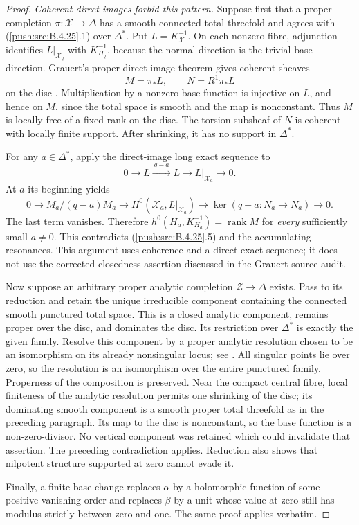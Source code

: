 \begin{proof}
\emph{Coherent direct images forbid this pattern.}
Suppose first that a proper completion
$\pi:\mathcal X\to\Delta$ has a smooth connected
total threefold and agrees with (\ref{push:src:B.4.25}.1) over
$\Delta^*$. Put $L=K_{\mathcal X}^{-1}$.
On each nonzero fibre, adjunction identifies
$L|_{\mathcal X_q}$ with $K_{H_q}^{-1}$, because
the normal direction is the trivial base direction.
Grauert's proper direct-image theorem gives coherent
sheaves
\[
 M=\pi_*L,\qquad N=R^1\pi_*L
\]
on the disc
\citep[Section 6, Hauptsatz I, p.~59]{Grauert1960D}.
Multiplication by a nonzero base function is injective
on $L$, and hence on $M$, since the total space is
smooth and the map is nonconstant. Thus $M$ is
locally free of a fixed rank on the disc. The torsion
subsheaf of $N$ is coherent with locally finite
support. After shrinking, it has no support in
$\Delta^*$.

For any $a\in\Delta^*$, apply the direct-image long
exact sequence to
\[
 0\longrightarrow L\xrightarrow{\ q-a\ }L
 \longrightarrow L|_{\mathcal X_a}\longrightarrow0.
\]
At $a$ its beginning yields
\[
 0\longrightarrow M_a/(q-a)M_a
 \longrightarrow H^0(\mathcal X_a,L|_{\mathcal X_a})
 \longrightarrow \ker(q-a:N_a\to N_a)
 \longrightarrow0.                                   \tag{B.4.25.6}
\]
The last term vanishes. Therefore
$h^0(H_a,K_{H_a}^{-1})=\operatorname{rank}M$ for
\emph{every} sufficiently small $a\ne0$. This
contradicts (\ref{push:src:B.4.25}.5) and the accumulating resonances.
This argument uses coherence and a direct exact
sequence; it does not use the corrected closedness
assertion discussed in the Grauert source audit.

Now suppose an arbitrary proper analytic completion
$\mathcal Z\to\Delta$ exists. Pass to its reduction
and retain the unique irreducible component containing
the connected smooth punctured total space. This is a
closed analytic component, remains proper over the
disc, and dominates the disc. Its restriction over
$\Delta^*$ is exactly the given family. Resolve this
component by a proper analytic resolution chosen to
be an isomorphism on its already nonsingular locus;
see \citet[Theorem 1.6 and the noncompact analytic
extension immediately following it]{BM95AB}.
All singular points lie over zero, so the resolution
is an isomorphism over the entire punctured family.
Properness of the composition is preserved. Near the
compact central fibre, local finiteness of the
analytic resolution permits one shrinking of the
disc; its dominating smooth component is a smooth
proper total threefold as in the preceding paragraph.
Its map to the disc is nonconstant, so the base
function is a non-zero-divisor. No vertical component
was retained which could invalidate that assertion.
The preceding contradiction applies. Reduction also
shows that nilpotent structure supported at zero
cannot evade it.

Finally, a finite base change replaces $\alpha$ by
a holomorphic function of some positive vanishing
order and replaces $\beta$ by a unit whose value
at zero still has modulus strictly between zero and
one. The same proof applies verbatim.
\end{proof}

